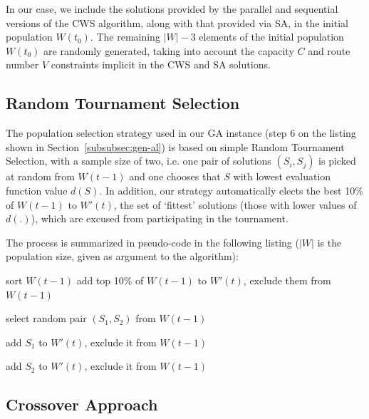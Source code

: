 In our case, we include the solutions provided 
by the parallel and sequential versions of the CWS algorithm, along with that 
provided via SA, in the initial population $W(t_0)$. The remaining $|W| - 3$ 
elements of the initial population $W(t_0)$ are randomly generated, taking into 
account the capacity $C$ and route number $V$ constraints implicit in the CWS and 
SA solutions.

\subsection{Random Tournament Selection}
\label{subsec:random-tournament}

The population selection strategy used in our GA instance (step 6 on the listing 
shown in Section~\ref{subsubsec:gen-al}) is based on simple 
Random Tournament Selection, with a sample size of two, i.e. one pair of 
solutions $(S_i,S_j)$ is picked at random from $W(t - 1)$ and one chooses that 
$S$ with lowest evaluation function value $d(S)$. In addition, our strategy 
automatically elects the best 10\% of $W(t - 1)$ to $W'(t)$, the set of `fittest' 
solutions (those with lower values of $d(.)$), which are excused from 
participating in the tournament.\vertbreak 

The process is summarized in pseudo-code in the following listing ($|W|$ is the 
population size, given as argument to the algorithm):\vertbreak

\begin{algorithmic}[1]

\State sort $W(t - 1)$
\State add top 10\% of $W(t - 1)$ to $W'(t)$, 
\Statex[1] exclude them from $W(t - 1)$


    \Repeat
        \State select random pair $(S_1,S_2)$ from $W(t - 1)$


        \State add $S_1$ to $W'(t)$, exclude it from $W(t - 1)$


        \State add $S_2$ to $W'(t)$, exclude it from $W(t - 1)$

    \EndIf

\EndWhile

\end{algorithmic}\vertbreak

\subsection{Crossover Approach}
\label{subsec:cross-over}

